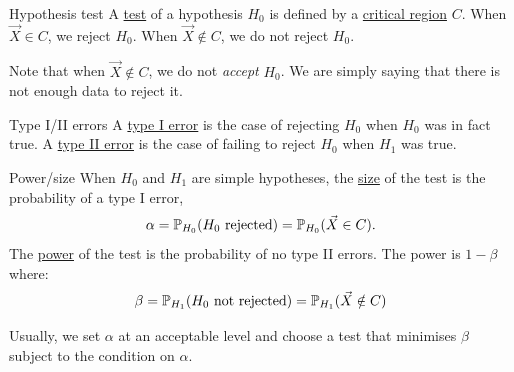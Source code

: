 \documentclass[../Main.tex]{subfiles}
\begin{document}
\begin{definition}{Hypothesis test}
    A \underline{test} of a hypothesis $H_0$ is defined by a \underline{critical region} $C$. When $\vec{X} \in C$, we reject $H_0$. When $\vec{X} \notin C$, we do not reject $H_0$.
\end{definition}
\begin{remark}
    Note that when $\vec{X} \notin C$, we do not \textit{accept} $H_0$. We are simply saying that there is not enough data to reject it.
\end{remark}
\begin{definition}{Type I/II errors}
    A \underline{type I error} is the case of rejecting $H_0$ when $H_0$ was in fact true.
    A \underline{type II error} is the case of failing to reject $H_0$ when $H_1$ was true.
\end{definition}
\begin{definition}{Power/size}
    When $H_0$ and $H_1$ are simple hypotheses, the \underline{size} of the test is the probability of a type I error,
    \begin{equation*}
        \alpha = \P_{H_0}(H_0 \text{ rejected}) = \P_{H_0}(\vec{X} \in C).
    \end{equation*}
    The \underline{power} of the test is the probability of no type II errors. The power is $1 - \beta$ where:
    \begin{equation*}
        \beta = \P_{H_1}(H_0 \text{ not rejected}) = \P_{H_1}(\vec{X} \notin C)
    \end{equation*}
\end{definition}
Usually, we set $\alpha$ at an acceptable level and choose a test that minimises $\beta$ subject to the condition on $\alpha$.
\end{document}
